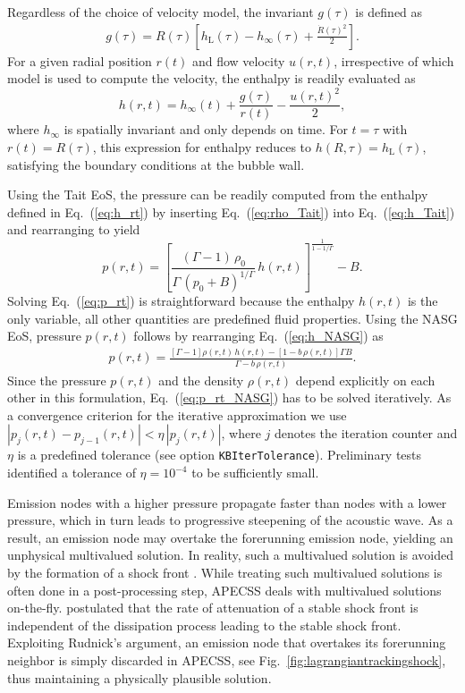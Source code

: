 Regardless of the choice of velocity model, the invariant $g(\tau)$ is defined as
\begin{align}
    g(\tau) = R(\tau) \left[h_\mathrm{L}(\tau) - h_\infty(\tau) + \frac{\dot{R}(\tau)^2}{2} \right]
    \label{eq:g_R} .
\end{align}
For a given radial position $r(t)$ and flow velocity $u(r,t)$, irrespective of which model is used to compute the velocity, the enthalpy is readily evaluated as
\begin{equation}
    h(r,t) = h_\infty(t) + \frac{g(\tau)}{r(t)} - \frac{u(r,t)^2}{2}, \label{eq:h_rt}
\end{equation}
where $h_\infty$ is spatially invariant and only depends on time. For $t=\tau$ with $r(t)=R(\tau)$, this expression for enthalpy reduces to $h(R,\tau)=h_\mathrm{L}(\tau)$, satisfying the boundary conditions at the bubble wall. 

Using the Tait EoS, the pressure can be readily computed from the enthalpy defined in Eq.~(\ref{eq:h_rt}) by inserting Eq.~(\ref{eq:rho_Tait}) into Eq.~(\ref{eq:h_Tait}) and rearranging to yield
\begin{equation}
    p(r,t) = \left[ \frac{(\Gamma-1) \, \rho_0}{\Gamma \, (p_0+B)^{1/\Gamma}} \, h(r,t) \right]^{\frac{1}{1-1/\Gamma}} - B. \label{eq:p_rt}
\end{equation}
Solving Eq.~(\ref{eq:p_rt}) is straightforward because the enthalpy $h(r,t)$ is the only variable, all other quantities are predefined fluid properties. Using the NASG EoS, pressure $p(r,t)$ follows by rearranging Eq.~(\ref{eq:h_NASG}) as
\begin{eqnarray}
p(r,t) = \frac{\left[\Gamma-1\right] \rho(r,t) \, h(r,t) - \left[1 - b \, \rho(r,t) \right] \Gamma B}{\Gamma - b \, \rho(r,t)}.  \label{eq:p_rt_NASG}
\end{eqnarray}
Since the pressure $p(r,t)$ and the density $\rho(r,t)$ depend explicitly on each other in this formulation, Eq.~(\ref{eq:p_rt_NASG}) has to be solved iteratively. As a convergence criterion for the iterative approximation we use $|p_j(r,t) - p_{j-1}(r,t)| < \eta \, |p_j(r,t)|$, where $j$ denotes the iteration counter and $\eta$ is a predefined tolerance (see option {\tt KBIterTolerance}). Preliminary tests identified a tolerance of $\eta = 10^{-4}$ to be sufficiently small.

Emission nodes with a higher pressure propagate faster than nodes with a lower pressure, which in turn leads to progressive steepening of the acoustic wave. As a result, an emission node may overtake the forerunning emission node, yielding an unphysical multivalued solution. In reality, such a multivalued solution is avoided by the formation of a shock front \citep{Fay1931}. While treating such multivalued solutions is often done in a post-processing step, APECSS deals with multivalued solutions on-the-fly. \citet{Rudnick1952} postulated that the rate of attenuation of a stable shock front is independent of the dissipation process leading to the stable shock front. Exploiting Rudnick's argument, an emission node that overtakes its forerunning neighbor is simply discarded in APECSS, see Fig.~\ref{fig:lagrangiantrackingshock}, thus maintaining a physically plausible solution.

